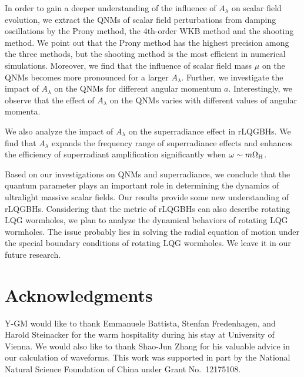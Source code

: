 \documentclass[12pt]{article}
\begin{document}
In order to gain a deeper understanding of the influence of $A_\lambda$ on scalar field evolution, we extract the QNMs of scalar field perturbations from damping oscillations by  the Prony method, the 4th-order WKB method and the shooting method. 
We point out that the Prony method has the highest precision among the three methods, but the shooting method is the most efficient in numerical simulations. 
Moreover, we find that  the influence of scalar field mass $\mu$ on the QNMs becomes more pronounced for a larger $A_\lambda$. Further, we investigate the impact of $A_\lambda$ on the QNMs for different angular momentum $a$. Interestingly, we observe that the effect of $A_\lambda$ on the QNMs varies with different values of angular momenta. %

We also analyze the impact of $A_\lambda$ on the superradiance effect in rLQGBHs. We find that $A_\lambda$ expands the frequency range of superradiance effects  and enhances the efficiency of superradiant amplification  significantly  when $\omega\sim m\Omega_{\rm H}$.

Based on our investigations on QNMs and superradiance, we conclude that the quantum parameter plays an important role in determining the dynamics of ultralight massive scalar fields.  Our results provide some new understanding of rLQGBHs. Considering that the metric of rLQGBHs can also describe  rotating LQG wormholes, we plan to analyze the dynamical behaviors of rotating LQG wormholes. The issue probably lies in solving the radial equation of motion under the special boundary conditions  of rotating LQG wormholes. We leave it in our future research.

\section*{Acknowledgments}
Y-GM would like to thank Emmanuele Battista, Stenfan Fredenhagen, and Harold Steinacker for the warm hospitality during his stay at University of Vienna. We would also like to thank Shao-Jun Zhang for his valuable advice in our calculation of waveforms. This work was supported in part by the National Natural Science Foundation of China under Grant No.\ 12175108.
\end{document}
